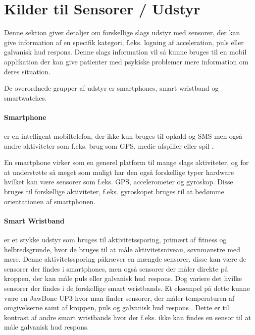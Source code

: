 \section{Kilder til Sensorer / Udstyr}\label{sec:kilder-til-sensorer}
Denne sektion giver detaljer om forskellige slags udstyr med sensorer, der kan give information af en specifik kategori, f.eks. logning af acceleration, puls eller galvanisk hud respons.
Denne slags information vil så kunne bruges til en mobil applikation der kan give patienter med psykiske problemer mere information om deres situation.

De overordnede grupper af udstyr er smartphones, smart wristband og smartwatches. 

\paragraph{Smartphone}
 er en intelligent mobiltelefon, der ikke kun bruges til opkald og SMS men også andre aktiviteter som f.eks. brug som GPS, medie afspiller eller spil \citep{misc:smartphone}.

En smartphone virker som en generel platform til mange slags aktiviteter, og for at understøtte så meget som muligt har den også forskellige typer hardware hvilket kan være sensorer som f.eks. GPS, accelerometer og gyroskop. Disse bruges til forskellige aktiviteter, f.eks. gyroskopet bruges til at bedømme orientationen af smartphonen. 

\paragraph{Smart Wristband} %
 er et stykke udstyr som bruges til aktivitetssporing, primært af fitness og helbredsgrunde, hvor de bruges til at måle aktivitetsniveau, søvnmønstre med mere.
Denne aktivitetssporing påkræver en mængde sensorer, disse kan være de sensorer der findes i smartphones, men også sensorer der måler direkte på kroppen, der kan måle puls eller galvanisk hud respons. 
Dog variere det hvilke sensorer der findes i de forskellige smart wristbands.
Et eksempel på dette kunne være en JawBone UP3 hvor man finder sensorer, der måler temperaturen af omgivelserne samt af kroppen, puls og galvanisk hud respons \citep{misc:jawboneup3sensors}. 
Dette er til kontrast af andre smart wristbands hvor der f.eks. ikke kan findes en sensor til at måle galvanisk hud respons.

